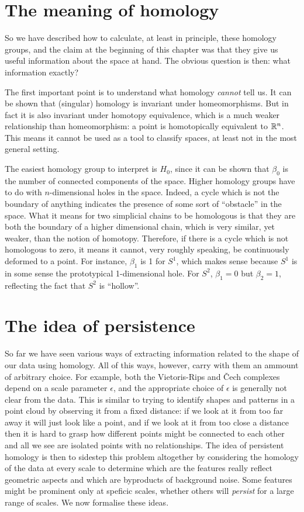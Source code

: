 \documentclass[../main.tex]{subfiles}
\begin{document}
\section{The meaning of homology}\label{sec:meaning}
So we have described how to calculate, at least in principle, these homology groups, and
the claim at the beginning of this chapter was that they give us useful information about
the space at hand. The obvious question is then: what information exactly?

The first important point is to understand what homology \emph{cannot} tell us. It can be
shown that (singular) homology is invariant under homeomorphisms. But in fact it is also
invariant under homotopy equivalence, which is a much weaker relationship than
homeomorphism: a point is homotopically equivalent to \( \mathbb{R}^n \). This means it cannot be
used as a tool to classify spaces, at least not in the most general setting. 

The easiest homology group to interpret is \( H_0 \), since it can be shown that \(
\beta_0 \) is the number of connected components of the space. Higher homology groups
have to do with \( n \)-dimensional holes in the space.  Indeed, a cycle which is not the
boundary of anything indicates the presence of some sort of ``obstacle'' in the space.
What it means for two simplicial chains to be homologous is that they are both the
boundary of a higher dimensional chain, which is very similar, yet weaker, than the notion
of homotopy. Therefore, if there is a cycle which is not homologous to zero, it means it
cannot, very roughly speaking, be continuously deformed to a point. For instance, \(
\beta_1 \) is 1 for \( S^1 \), which makes sense because \( S^1 \) is in some sense the
prototypical 1-dimensional hole. For \( S^2 \), \( \beta_1 = 0 \) but \( \beta_2 = 1 \),
reflecting the fact that \( S^2 \) is ``hollow''. 

\section{The idea of persistence}\label{sec:persistence} 
So far we have seen various ways of extracting information related to the shape of our
data using homology. All of this ways, however, carry with them an ammount of arbitrary
choice. For example, both the Vietoris-Rips and Čech complexes depend on a scale parameter
\( \epsilon \), and the appropriate choice of \( \epsilon \) is generally not clear from
the data. This is similar to trying to identify shapes and patterns in a point cloud
by observing it from a fixed distance: if we look at it from too far away it will just
look like a point, and if we look at it from too close a distance then it is hard to grasp
how different points might be connected to each other and all we see are isolated points
with no relationships. The idea of persistent homology is then to sidestep this problem altogether by
considering the homology of the data at every scale to determine which are the features
really reflect geometric aspects and which are byproducts of background noise. Some
features might be prominent only at speficic scales, whether others will \emph{persist}
for a large range of scales. We now formalise these ideas.
\end{document}
